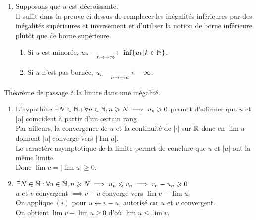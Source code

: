 \documentclass{article}
\renewenvironment{question_kholle}[2][ ]
{
	\subsection{\texorpdfstring{#2}{}}
	\notblank{#1}
	{
		\noindent #1
		\bigbreak
	}
	{}
	\begin{proof}
}
{
	\end{proof}
}
\begin{document}
\begin{question_kholle}
\begin{enumerate}
		\item Supposons que $u$ est décroissante. \\
		      Il suffit dans la preuve ci-dessus de remplacer les inégalités
		      inférieures par des inégalités supérieures et inversement et
		      d'utiliser la notion de borne inférieure plutôt que de borne supérieure.
		      \begin{enumerate}[label=($\roman*$)]
			      \item Si $u$ est minorée, $u_n \ \xrightarrow[\;n \to +\infty\;]{}\ 
				            \inf\{u_k|k\in\mathbb N\}$.
			      \item Si $u$ n'est pas bornée, $u_n \ \xrightarrow[\;n \to +\infty\;]{}\  -\infty$.
		      \end{enumerate}
	\end{enumerate}
\end{question_kholle}

	{Théorème de passage à la limite dans une inégalité.}
	~\smallbreak
	\begin{enumerate}[label=($\roman*$)]
		\item L'hypothèse $\exists N \in \mathbb N : \forall n \in \mathbb N, n
			      \geqslant N \implies u_{n} \geqslant 0$ permet d'affirmer que
		      $u$ et $|u|$ coïncident à partir d'un certain rang. \\
		      Par ailleurs, la convergence de $u$ et la continuité de
		      $|\cdot|$ sur $\mathbb R$ donc en $\lim u$ donnent $|u|$ converge vers
		      $|\lim u|$. \\
		      Le caractère asymptotique de la limite permet de conclure que
		      $u$ et $|u|$ ont la même limite. \\
		      Donc $\lim u = |\lim u| \geqslant 0$.
		\item $\exists N \in \mathbb N : \forall n \in \mathbb N, n \geqslant N
			      \implies u_{n} \leqslant v_{n} \implies v_{n} - u_{n} \geqslant 0$ \\
		      $u$ et $v$ convergent $\implies v-u$ converge vers $\lim v - \lim u$. \\
		      On applique $(i)$ pour $u \leftarrow v - u$, autorisé car $u
			      \text{ et }v$ convergent. \\
		      On obtient $\lim v - \lim u \geqslant 0$ d'où $\lim u \leqslant \lim v$.
	\end{enumerate}
\end{question_kholle}
\end{document}
